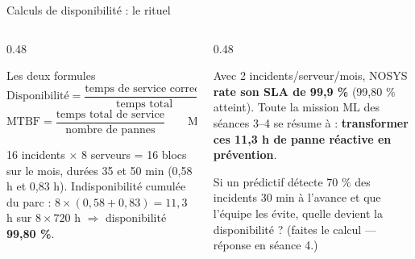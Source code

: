 \begin{frame}{Calculs de disponibilité : le rituel}
\begin{columns}[t]
\begin{column}{0.48\textwidth}
\begin{block}{Les deux formules}
\[
\text{Disponibilité} = \frac{\text{temps de service correct}}{\text{temps total}}
= 1 - \frac{\text{indisponibilité}}{\text{temps total}}
\]
\[
\text{MTBF} = \frac{\text{temps total de service}}{\text{nombre de pannes}}
\qquad
\text{MTTR} = \frac{\text{temps cumulé de réparation}}{\text{nombre de pannes}}
\]
\end{block}
\begin{ebox}
16 incidents $\times$ 8 serveurs = 16 blocs sur le mois, durées
35 et 50 min (0,58 h et 0,83 h). Indisponibilité cumulée du parc :
$8 \times (0{,}58 + 0{,}83) = 11{,}3$ h sur $8 \times 720$ h
$\Rightarrow$ disponibilité \textbf{99,80 \%}.
\end{ebox}
\end{column}
\begin{column}{0.48\textwidth}
\begin{wbox}
Avec 2 incidents/serveur/mois, NOSYS \textbf{rate son SLA de 99,9 \%}
(99,80 \% atteint). Toute la mission ML des séances 3--4 se résume à :
\textbf{transformer ces 11,3 h de panne réactive en prévention}.
\end{wbox}
\begin{qbox}
Si un prédictif détecte 70 \% des incidents 30 min à l'avance et que
l'équipe les évite, quelle devient la disponibilité ?
(faites le calcul --- réponse en séance 4.)
\end{qbox}
\end{column}
\end{columns}
\end{frame}

